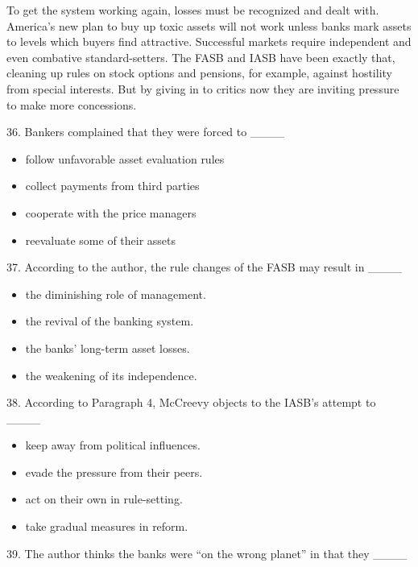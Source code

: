 \documentclass[UTF8,11pt]{ctexart}
\begin{document}
To get the system working again, losses must be recognized and dealt with. America’s new plan to buy up toxic assets will not work unless banks mark assets to levels which buyers find attractive. Successful markets require independent and even combative standard-setters. The FASB and IASB have been exactly that, cleaning up rules on stock options and pensions, for example, against hostility from special interests. But by giving in to critics now they are inviting pressure to make more concessions.


36. Bankers complained that they were forced to \_\_\_\_


\begin{itemize}[leftmargin=2em,itemsep=.2em,topsep=.4em]\item[A.] follow unfavorable asset evaluation rules
\item[B.] collect payments from third parties
\item[C.] cooperate with the price managers
\item[D.] reevaluate some of their assets
\end{itemize}

37. According to the author, the rule changes of the FASB may result in \_\_\_\_


\begin{itemize}[leftmargin=2em,itemsep=.2em,topsep=.4em]\item[A.] the diminishing role of management.
\item[B.] the revival of the banking system.
\item[C.] the banks’ long-term asset losses.
\item[D.] the weakening of its independence.
\end{itemize}

38. According to Paragraph 4, McCreevy objects to the IASB’s attempt to \_\_\_\_


\begin{itemize}[leftmargin=2em,itemsep=.2em,topsep=.4em]\item[A.] keep away from political influences.
\item[B.] evade the pressure from their peers.
\item[C.] act on their own in rule-setting.
\item[D.] take gradual measures in reform.
\end{itemize}

39. The author thinks the banks were “on the wrong planet” in that they \_\_\_\_
\end{document}
